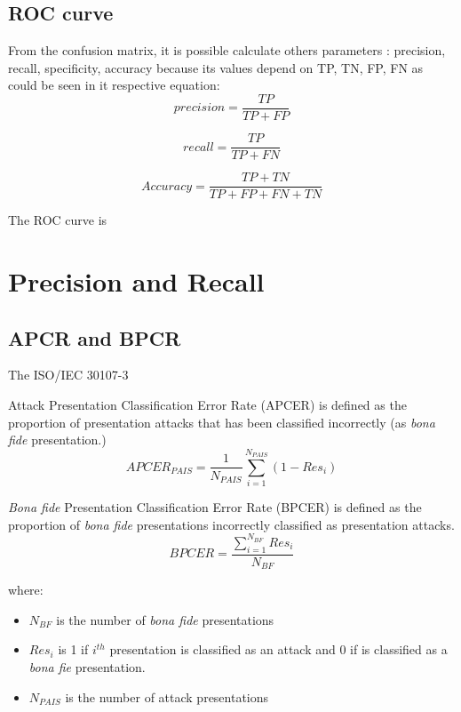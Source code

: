 \subsection{ROC curve}
From the confusion matrix, it is possible calculate others parameters \cite{Sokolova}: precision, recall, specificity, accuracy because its values depend on TP, TN, FP, FN as could be seen in it respective equation:\\
\begin{equation}
  precision = \frac{TP}{TP + FP}
\end{equation}

\begin{equation}
  recall = \frac{TP}{TP + FN}
\end{equation}

\begin{equation}
  Accuracy = \frac{TP + TN}{TP + FP + FN + TN}
\end{equation}

The ROC curve is \\

\section{Precision and Recall}

\subsection{APCR and BPCR}
The ISO/IEC 30107-3 \cite{ISO}

Attack Presentation Classification Error Rate (APCER) is defined as the proportion of presentation attacks that has been classified incorrectly (as \textit{bona fide} presentation.)\\

\begin{equation}
  APCER_{PAIS} = \frac{1}{N_{PAIS}}\sum_{i=1}^{N_{PAIS}}(1 - Res_{i})
\end{equation}

\textit{Bona fide} Presentation Classification Error Rate (BPCER) is defined as the proportion of \textit{bona fide} presentations  incorrectly classified as presentation attacks.\\

\begin{equation}
  BPCER = \frac{\sum_{i=1}^{N_{BF}}Res_{i}}{N_{BF}}
\end{equation}


where: \begin{itemize}
\item $N_{BF}$ is the number of \textit{bona fide} presentations
\item $Res_{i}$ is 1 if $i^{th}$ presentation is classified as an attack and 0 if is classified as a \textit{bona fie} presentation.
\item $N_{PAIS}$ is the number of attack presentations
\end{itemize}
